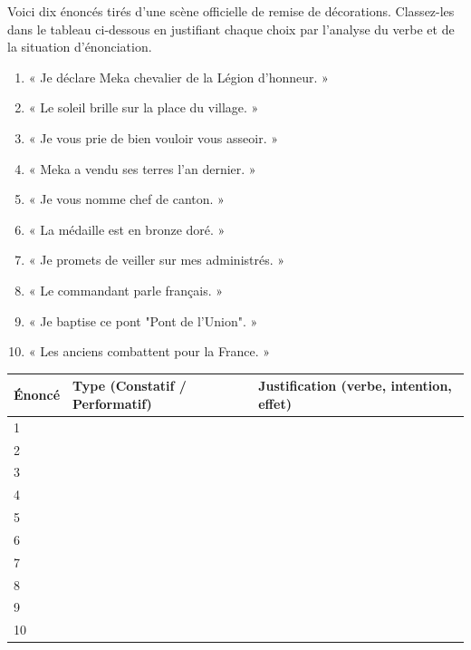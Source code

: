 \documentclass[11pt]{article}
\begin{document}
\begin{exercice}
Voici dix énoncés tirés d'une scène officielle de remise de décorations. Classez-les dans le tableau ci-dessous en justifiant chaque choix par l'analyse du verbe et de la situation d'énonciation.
\begin{enumerate}
    \item « Je déclare Meka chevalier de la Légion d'honneur. »
    \item « Le soleil brille sur la place du village. »
    \item « Je vous prie de bien vouloir vous asseoir. »
    \item « Meka a vendu ses terres l'an dernier. »
    \item « Je vous nomme chef de canton. »
    \item « La médaille est en bronze doré. »
    \item « Je promets de veiller sur mes administrés. »
    \item « Le commandant parle français. »
    \item « Je baptise ce pont "Pont de l'Union". »
    \item « Les anciens combattent pour la France. »
\end{enumerate}
\begin{center}
\begin{tabularx}{\linewidth}{|X|X|X|}\hline
\textbf{Énoncé} & \textbf{Type (Constatif / Performatif)} & \textbf{Justification (verbe, intention, effet)} \\ \hline
1 & & \\ \hline
2 & & \\ \hline
3 & & \\ \hline
4 & & \\ \hline
5 & & \\ \hline
6 & & \\ \hline
7 & & \\ \hline
8 & & \\ \hline
9 & & \\ \hline
10 & & \\ \hline
\end{tabularx}
\end{center}
\end{exercice}
\end{document}
